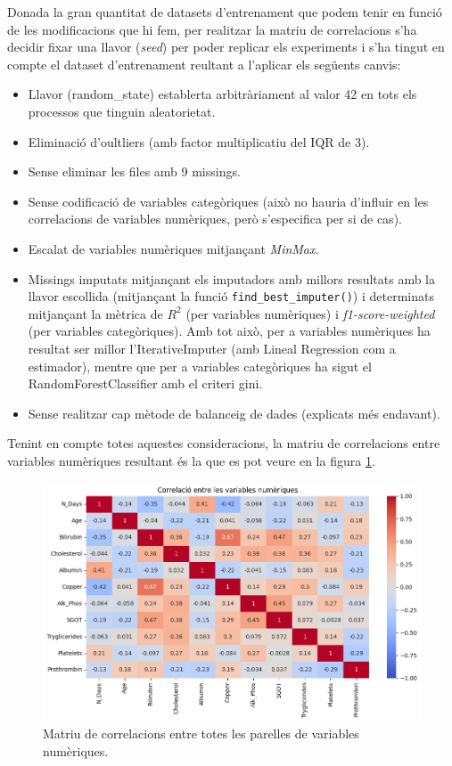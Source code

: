 Donada la gran quantitat de datasets d'entrenament que podem tenir en funció de les modificacions que hi fem, per realitzar la matriu de correlacions s'ha decidir fixar una llavor (\textit{seed}) per poder replicar els experiments i s'ha tingut en compte el dataset d'entrenament reultant a l'aplicar els següents canvis:
\begin{itemize}
	\item Llavor (random\_state) establerta arbitràriament al valor 42 en tots els processos que tinguin aleatorietat.
	\item Eliminació d'oultliers (amb factor multiplicatiu del IQR de 3).
	\item Sense eliminar les files amb 9 missings.
	\item Sense codificació de variables categòriques (això no hauria d'influir en les correlacions de variables numèriques, però s'especifica per si de cas).
	\item Escalat de variables numèriques mitjançant \textit{MinMax}.
	\item Missings imputats mitjançant els imputadors amb millors resultats amb la llavor escollida (mitjançant la funció \texttt{find\_best\_imputer()}) i determinats mitjançant la mètrica de $R^2$ (per variables numèriques) i \textit{f1-score-weighted} (per variables categòriques). Amb tot això, per a variables numèriques ha resultat ser millor l'IterativeImputer (amb Lineal Regression com a estimador), mentre que per a variables categòriques ha sigut el RandomForestClassifier amb el criteri gini.
	\item Sense realitzar cap mètode de balanceig de dades (explicats més endavant).
\end{itemize}

Tenint en compte totes aquestes consideracions, la matriu de correlacions entre variables numèriques resultant és la que es pot veure en la figura \ref{fig:num-corr}.

\begin{figure}[H]
	\centering
	\includegraphics[width=0.9\linewidth]{img/num-corr.png}
	\caption{Matriu de correlacions entre totes les parelles de variables numèriques.}
	\label{fig:num-corr}
\end{figure}

